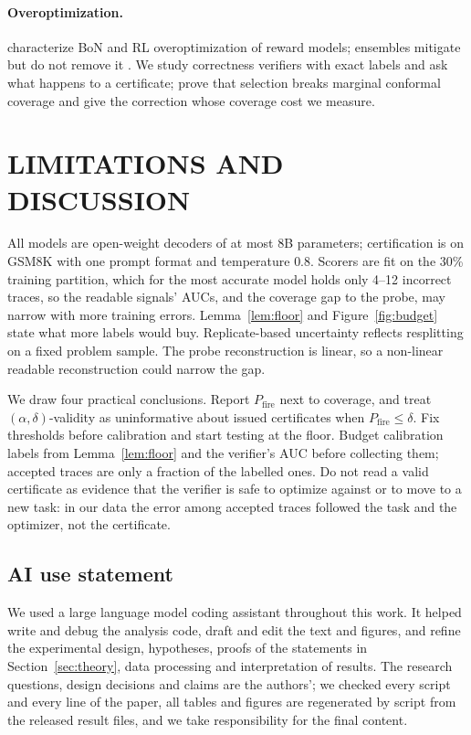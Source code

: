 \documentclass[twoside]{article}
\theoremstyle{remark}
\newcommand{\pfire}{P_{\mathrm{fire}}}
\begin{document}
\paragraph{Overoptimization.} \citet{gao2023scaling} characterize BoN and RL overoptimization of reward models; ensembles mitigate but do not remove it \citep{coste2024ensembles,eisenstein2023herding}. We study correctness verifiers with exact labels and ask what happens to a certificate; \citet{jin2025focal} prove that selection breaks marginal conformal coverage and give the correction whose coverage cost we measure.

\section{LIMITATIONS AND DISCUSSION}

All models are open-weight decoders of at most 8B parameters; certification is on GSM8K with one prompt format and temperature $0.8$. Scorers are fit on the 30\% training partition, which for the most accurate model holds only 4--12 incorrect traces, so the readable signals' AUCs, and the coverage gap to the probe, may narrow with more training errors. Lemma~\ref{lem:floor} and Figure~\ref{fig:budget} state what more labels would buy. Replicate-based uncertainty reflects resplitting on a fixed problem sample. The probe reconstruction is linear, so a non-linear readable reconstruction could narrow the gap.

We draw four practical conclusions. Report $\pfire$ next to coverage, and treat $(\alpha,\delta)$-validity as uninformative about issued certificates when $\pfire\le\delta$. Fix thresholds before calibration and start testing at the floor. Budget calibration labels from Lemma~\ref{lem:floor} and the verifier's AUC before collecting them; accepted traces are only a fraction of the labelled ones. Do not read a valid certificate as evidence that the verifier is safe to optimize against or to move to a new task: in our data the error among accepted traces followed the task and the optimizer, not the certificate.

\subsection*{AI use statement}

We used a large language model coding assistant throughout this work. It helped write and debug the analysis code, draft and edit the text and figures, and refine the experimental design, hypotheses, proofs of the statements in Section~\ref{sec:theory}, data processing and interpretation of results. The research questions, design decisions and claims are the authors'; we checked every script and every line of the paper, all tables and figures are regenerated by script from the released result files, and we take responsibility for the final content.





\clearpage
\appendix
\thispagestyle{empty}
\onecolumn
{}


\end{document}
